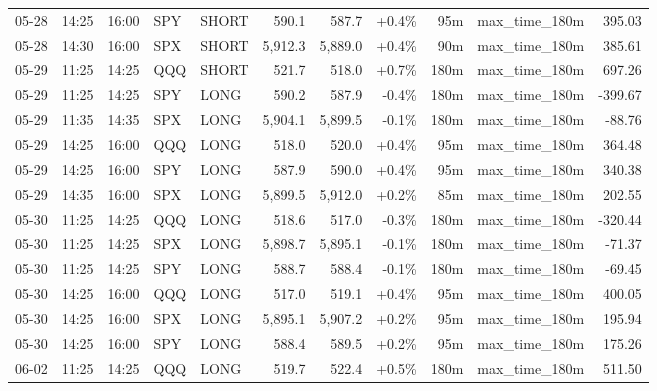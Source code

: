 \documentclass[11pt,a4paper,twoside]{article}
\begin{document}
\begin{center}
\begin{longtable}{>{\color{txtmain}}l l l l l r r r r >{\color{txtmain}}l r}
05-28 & 14:25 & 16:00 & SPY & SHORT & 590.1 & 587.7 & \textcolor{wingreen}{+0.4\%} & 95m & max\_time\_180m & \textcolor{wingreen}{395.03} \\
05-28 & 14:30 & 16:00 & SPX & SHORT & 5,912.3 & 5,889.0 & \textcolor{wingreen}{+0.4\%} & 90m & max\_time\_180m & \textcolor{wingreen}{385.61} \\
05-29 & 11:25 & 14:25 & QQQ & SHORT & 521.7 & 518.0 & \textcolor{wingreen}{+0.7\%} & 180m & max\_time\_180m & \textcolor{wingreen}{697.26} \\
05-29 & 11:25 & 14:25 & SPY & LONG & 590.2 & 587.9 & \textcolor{lossred}{-0.4\%} & 180m & max\_time\_180m & \textcolor{lossred}{-399.67} \\
05-29 & 11:35 & 14:35 & SPX & LONG & 5,904.1 & 5,899.5 & \textcolor{lossred}{-0.1\%} & 180m & max\_time\_180m & \textcolor{lossred}{-88.76} \\
05-29 & 14:25 & 16:00 & QQQ & LONG & 518.0 & 520.0 & \textcolor{wingreen}{+0.4\%} & 95m & max\_time\_180m & \textcolor{wingreen}{364.48} \\
05-29 & 14:25 & 16:00 & SPY & LONG & 587.9 & 590.0 & \textcolor{wingreen}{+0.4\%} & 95m & max\_time\_180m & \textcolor{wingreen}{340.38} \\
05-29 & 14:35 & 16:00 & SPX & LONG & 5,899.5 & 5,912.0 & \textcolor{wingreen}{+0.2\%} & 85m & max\_time\_180m & \textcolor{wingreen}{202.55} \\
05-30 & 11:25 & 14:25 & QQQ & LONG & 518.6 & 517.0 & \textcolor{lossred}{-0.3\%} & 180m & max\_time\_180m & \textcolor{lossred}{-320.44} \\
05-30 & 11:25 & 14:25 & SPX & LONG & 5,898.7 & 5,895.1 & \textcolor{lossred}{-0.1\%} & 180m & max\_time\_180m & \textcolor{lossred}{-71.37} \\
05-30 & 11:25 & 14:25 & SPY & LONG & 588.7 & 588.4 & \textcolor{lossred}{-0.1\%} & 180m & max\_time\_180m & \textcolor{lossred}{-69.45} \\
05-30 & 14:25 & 16:00 & QQQ & LONG & 517.0 & 519.1 & \textcolor{wingreen}{+0.4\%} & 95m & max\_time\_180m & \textcolor{wingreen}{400.05} \\
05-30 & 14:25 & 16:00 & SPX & LONG & 5,895.1 & 5,907.2 & \textcolor{wingreen}{+0.2\%} & 95m & max\_time\_180m & \textcolor{wingreen}{195.94} \\
05-30 & 14:25 & 16:00 & SPY & LONG & 588.4 & 589.5 & \textcolor{wingreen}{+0.2\%} & 95m & max\_time\_180m & \textcolor{wingreen}{175.26} \\
06-02 & 11:25 & 14:25 & QQQ & LONG & 519.7 & 522.4 & \textcolor{wingreen}{+0.5\%} & 180m & max\_time\_180m & \textcolor{wingreen}{511.50} \\

\end{longtable}
\end{center}
\end{document}
